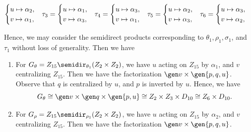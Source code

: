 \begin{solenum}[spsol]
\begin{itemize}
\begin{itemize}
\[\begin{cases}
                    u \mapsto \alpha_2, \\
                    v \mapsto \alpha_1,
                \end{cases} \hspace{-2pt}
                \tau_3 =
                \begin{cases}
                    u \mapsto \alpha_1, \\
                    v \mapsto \alpha_3,
                \end{cases} \hspace{-2pt}
                \tau_4 =
                \begin{cases}
                    u \mapsto \alpha_3, \\
                    v \mapsto \alpha_1,
                \end{cases} \hspace{-2pt}
                \tau_5 = 
                \begin{cases}
                    u \mapsto \alpha_2, \\
                    v \mapsto \alpha_3,
                \end{cases} \hspace{-2pt}
                \tau_6 =
                \begin{cases}
                    u \mapsto \alpha_3, \\
                    v \mapsto \alpha_2,
                \end{cases}
	        \]
        \end{itemize}
        Hence, we may consider the semidirect products corresponding to $\theta_1, \rho_1, \sigma_1$, and $\tau_1$ without loss of generality.
	Then we have
        \begin{enumerate}
            \item For $G_\theta = Z_{15} \semidir_{\theta_1} (Z_2 \times Z_2)$, we have $u$ acting on $Z_{15}$ by $\alpha_1$, and $v$ centralizing $Z_{15}$.
	Then we have the factorization $\gen v \times \gen{p, q, u}$.
	Observe that $q$ is centralized by $u$, and $p$ is inverted by $u$.
	Hence, we have
            \[
            	G_\theta \cong \gen v \times \gen q \times \gen{p, u} \cong Z_2 \times Z_3 \times D_{10} \cong Z_6 \times D_{10}.
            \]
            \item For $G_\rho = Z_{15} \semidir_{\rho_1} (Z_2 \times Z_2)$, we have $u$ acting on $Z_{15}$ by $\alpha_2$, and $v$ centralizing $Z_{15}$.
	Then we have the factorization $\gen v \times \gen{p, q, u}$.

\end{enumerate}
\end{itemize}
\end{solenum}
